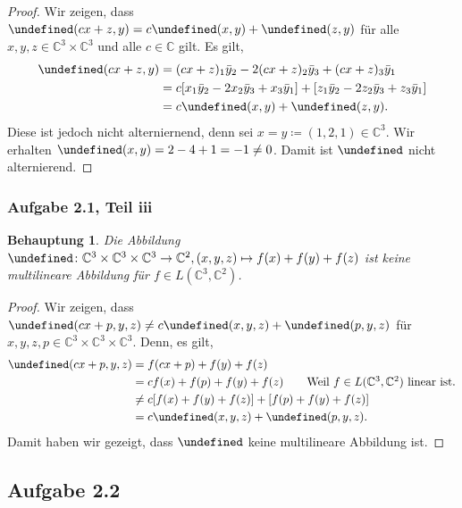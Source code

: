 \documentclass[draft,a5paper]{article}
\newtheorem*{beh}{Behauptung}
\let\phi\undefined
\newcommand{\phi}{\varphi}
\begin{document}
\begin{proof}
  Wir zeigen, dass \(\phi(cx+z,y) = c\phi(x,y) + \phi(z,y)\) für alle \(x, y, z
  \in \mathbb{C}^{3} \times \mathbb{C}^{3} \) und alle \(c \in \mathbb{C}\) gilt. Es gilt,
  \begin{align*}
    \phi(cx+z,y)
    &= (cx+z)_{1}\bar{y}_{2} - 2(cx+z)_{2}\bar{y}_{3} + (cx+z)_{3}
      \bar{y}_{1} \\
    &= c[x_{1}\bar{y}_{2} - 2x_{2}\bar{y}_{3} + x_{3}\bar{y}_{1}]
      + [z_{1}\bar{y}_{2} - 2z_{2}\bar{y}_{3} + z_{3}\bar{y}_{1}] \\
    &= c\phi(x, y) + \phi(z, y).
  \end{align*}
  Diese ist jedoch nicht alterniernend, denn sei
  \(x = y \coloneq (1, 2, 1) \in \mathbb{C}^{3}\).  Wir erhalten
  \(\phi(x,y) = 2 - 4 + 1 = -1 \ne 0\).  Damit ist \(\phi\) nicht
  alternierend.
\end{proof}

\subsubsection*{Aufgabe 2.1, Teil iii}

\begin{beh}
  Die Abbildung \(\phi \colon \mathbb{C}^{3} \times \mathbb{C}^{3} \times \mathbb{C}^{3} \to \mathbb{C}^{2}, (x, y, z) \mapsto f(x) +
  f(y) + f(z)\) ist keine multilineare Abbildung für \(f \in
  L(\mathbb{C}^{3}, \mathbb{C}^{2})\).
\end{beh}

\begin{proof}
  Wir zeigen, dass \(\phi(cx+p, y, z) \ne c\phi(x,y,z) + \phi(p,y,z)\) für
  \(x, y, z, p \in \mathbb{C}^{3} \times \mathbb{C}^{3} \times \mathbb{C}^{3} \).
  Denn, es gilt,
  \begin{align*}
    \phi(cx+p, y, z)
    &= f(cx+p) + f(y) + f(z) \\
    &= cf(x) + f(p) + f(y) + f(z) \tag*{Weil \(f \in L(\mathbb{C}^{3}, \mathbb{C}^{2})\) linear ist.} \\
    &\ne c[f(x) + f(y) + f(z)] + [f(p) + f(y) + f(z)] \\
    &= c\phi(x, y, z) + \phi(p, y, z).
  \end{align*}
  Damit haben wir gezeigt, dass \(\phi\) keine multilineare Abbildung ist.
\end{proof}

\subsection*{Aufgabe 2.2}
\end{document}
